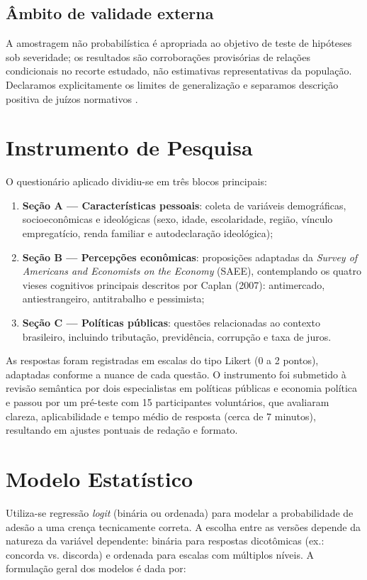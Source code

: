 \subsection{Âmbito de validade externa}
A amostragem não probabilística é apropriada ao objetivo de teste de hipóteses sob severidade; os resultados são corroborações provisórias de relações condicionais no recorte estudado, não estimativas representativas da população. Declaramos explicitamente os limites de generalização e separamos descrição positiva de juízos normativos \cite{hausman2008}.


\section{Instrumento de Pesquisa}

O questionário aplicado dividiu-se em três blocos principais:
\begin{enumerate}[label=\alph*)]
    \item \textbf{Seção A — Características pessoais}: coleta de variáveis demográficas, socioeconômicas e ideológicas (sexo, idade, escolaridade, região, vínculo empregatício, renda familiar e autodeclaração ideológica);
    \item \textbf{Seção B — Percepções econômicas}: proposições adaptadas da \textit{Survey of Americans and Economists on the Economy} (SAEE), contemplando os quatro vieses cognitivos principais descritos por Caplan (2007): antimercado, antiestrangeiro, antitrabalho e pessimista;
    \item \textbf{Seção C — Políticas públicas}: questões relacionadas ao contexto brasileiro, incluindo tributação, previdência, corrupção e taxa de juros.
\end{enumerate}

As respostas foram registradas em escalas do tipo Likert (0 a 2 pontos), adaptadas conforme a nuance de cada questão. O instrumento foi submetido à revisão semântica por dois especialistas em políticas públicas e economia política e passou por um pré-teste com 15 participantes voluntários, que avaliaram clareza, aplicabilidade e tempo médio de resposta (cerca de 7 minutos), resultando em ajustes pontuais de redação e formato.

\section{Modelo Estatístico}\label{sec:modelo-estatistico}

Utiliza-se regressão \textit{logit} (binária ou ordenada) para modelar a probabilidade de adesão a uma crença tecnicamente correta. A escolha entre as versões depende da natureza da variável dependente: binária para respostas dicotômicas (ex.: concorda vs. discorda) e ordenada para escalas com múltiplos níveis. A formulação geral dos modelos é dada por:

